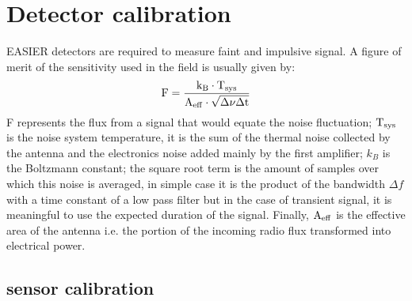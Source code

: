 \section{Detector calibration}
\label{sec:calibration}	
EASIER detectors  are required to measure faint  and impulsive signal.
A figure  of merit  of the  sensitivity used in  the field  is usually
given by:
\begin{equation}
\rm  F  =  \frac{k_{B}\cdot  T_{sys} }{A_{eff}\cdot  \sqrt{\Delta  \nu
    \Delta t}}
\label{eq:sensitivity}  
\end{equation}
F  represents the  flux  from a  signal  that would  equate the  noise
fluctuation;  $\rm T_{sys}$  is  the noise  system temperature, it is the sum of the thermal noise collected by the antenna and the electronics noise  added mainly by the first amplifier; $k_B$ is  the Boltzmann constant;  the square  root term is the amount of samples  over which this noise is  averaged, in simple case
it is the product of the  bandwidth $\Delta f$ with a time constant of
a low pass filter but in the  case of transient signal, it is meaningful
to use the expected duration of the signal. Finally, $\rm A_{eff}$ is
the effective  area of the antenna  i.e.  the portion  of the incoming
radio flux transformed into electrical power.
\subsection{sensor calibration}
